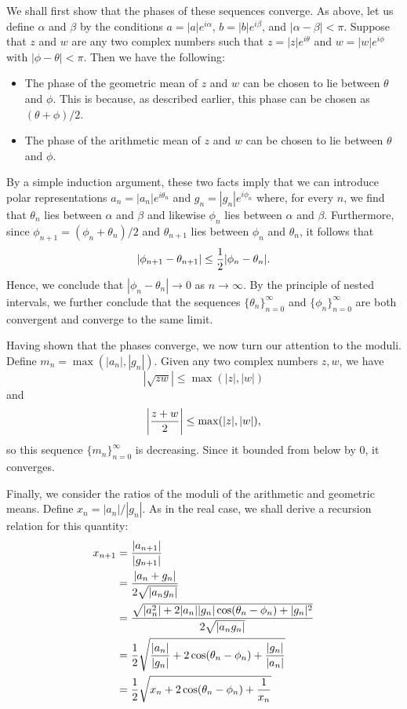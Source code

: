 \documentclass[12pt]{article}
\begin{document}
We shall first show that the phases of these sequences converge.  As above,
let us define $\alpha$ and $\beta$ by the conditions $a = |a| e^{i \alpha}$,
$b = |b| e^{i \beta}$, and $|\alpha - \beta| < \pi$.  Suppose that $z$ and
$w$ are any two complex numbers such that $z = |z| e^{i \theta}$ and $w = 
|w| e^{i \phi}$ with $|\phi - \theta| < \pi$.  Then we have the following:
\begin{itemize}
\item  The phase of the geometric mean of $z$ and $w$ can be chosen to lie
between $\theta$ and $\phi$.  This is because, as described earlier, this
phase can be chosen as $(\theta + \phi)/2$.
\item The phase of the arithmetic mean of $z$ and $w$ can be chosen to lie
between $\theta$ and $\phi$.
\end{itemize}
By a simple induction argument, these two facts imply that we can introduce
polar representations $a_n = |a_n| e^{i \theta_n}$ and $g_n = |g_n|
e^{i \phi_n}$ where, for every $n$, we find that $\theta_n$ lies between
$\alpha$ and $\beta$ and likewise $\phi_n$ lies between $\alpha$ and $\beta$.
Furthermore, since $\phi_{n+1} = (\phi_n + \theta_n) / 2$ and $\theta_{n+1}$ 
lies between $\phi_n$ and $\theta_n$, it follows that
\[
|\phi_{n+1} - \theta_{n+1}| \le
{1 \over 2} |\phi_n - \theta_n| .
\]
Hence, we conclude that $|\phi_n - \theta_n| \to 0$ as $n \to \infty$.  By 
the principle of nested intervals, we further conclude that the sequences
$\{\theta_n\}_{n=0}^\infty$ and $\{\phi_n\}_{n=0}^\infty$ are both convergent 
and converge to the same limit.

Having shown that the phases converge, we now turn our attention to the
moduli.  Define $m_n = \max (|a_n|, |g_n|)$.  Given any two complex
numbers $z,w$, we have
\[
|\sqrt{zw}| \le \max (|z|,|w|)
\]
and
\[
\left| {z + w \over 2} \right| \le
\max (|z|,|w|) ,
\]
so this sequence $\{m_n\}_{n=0}^\infty$ is decreasing.  Since it bounded from
below by $0$, it converges.

Finally, we consider the ratios of the moduli of the arithmetic and geometric 
means.  Define $x_n = |a_n| / |g_n|$.  As in the real case, we shall derive a
recursion relation for this quantity:
\begin{align*}
x_{n+1} &= 
{|a_{n+1}| \over |g_{n+1}|} \\ &= 
{|a_n + g_n| \over 2 \sqrt{|a_n g_n|}} \\&=
{\sqrt{|a_n^2| + 2 |a_n| |g_n| \cos (\theta_n - \phi_n) + |g_n|^2} 
\over 2 \sqrt{|a_n g_n|}} \\&=
{1 \over 2}
\sqrt{ {|a_n| \over |g_n|} +
2 \cos (\theta_n - \phi_n) +
{|g_n| \over |a_n|}} \\ &=
{1 \over 2}
\sqrt {x_n + 2 \cos (\theta_n - \phi_n) + {1 \over x_n}}
\end{align*}
\end{document}
